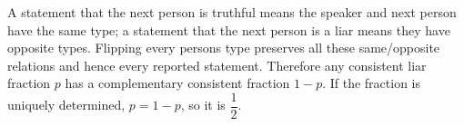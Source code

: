 A statement that the next person is truthful means the speaker and next person have the same type; a statement that the next person is a liar means they have opposite types. Flipping every person\textquotesingle s type preserves all these same/opposite relations and hence every reported statement. Therefore any consistent liar fraction $p$ has a complementary consistent fraction $1-p$. If the fraction is uniquely determined, $p=1-p$, so it is $\boxed{\dfrac{1}{2}}$.

